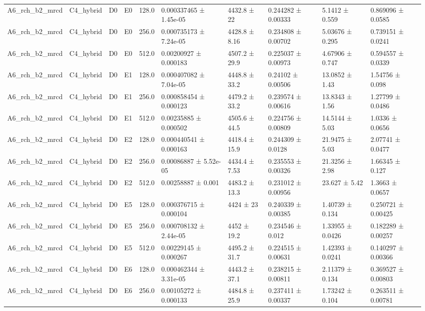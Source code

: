 \begin{table}
\begin{tabular}{llllllllll}
A6\_rch\_b2\_mrcd & C4\_hybrid & D0 & E0 & 128.0 & 0.000337465 ± 1.45e-05 & 4432.8 ± 22 & 0.244282 ± 0.00333 & 5.1412 ± 0.559 & 0.869096 ± 0.0585 \\
A6\_rch\_b2\_mrcd & C4\_hybrid & D0 & E0 & 256.0 & 0.000735173 ± 7.24e-05 & 4428.8 ± 8.16 & 0.234808 ± 0.00702 & 5.03676 ± 0.295 & 0.739151 ± 0.0241 \\
A6\_rch\_b2\_mrcd & C4\_hybrid & D0 & E0 & 512.0 & 0.00200927 ± 0.000183 & 4507.2 ± 29.9 & 0.225037 ± 0.00973 & 4.67906 ± 0.747 & 0.594557 ± 0.0339 \\
A6\_rch\_b2\_mrcd & C4\_hybrid & D0 & E1 & 128.0 & 0.000407082 ± 7.04e-05 & 4448.8 ± 33.2 & 0.24102 ± 0.00506 & 13.0852 ± 1.43 & 1.54756 ± 0.098 \\
A6\_rch\_b2\_mrcd & C4\_hybrid & D0 & E1 & 256.0 & 0.000858454 ± 0.000123 & 4479.2 ± 33.2 & 0.239574 ± 0.00616 & 13.8343 ± 1.56 & 1.27799 ± 0.0486 \\
A6\_rch\_b2\_mrcd & C4\_hybrid & D0 & E1 & 512.0 & 0.00235885 ± 0.000502 & 4505.6 ± 44.5 & 0.224756 ± 0.00809 & 14.5144 ± 5.03 & 1.0336 ± 0.0656 \\
A6\_rch\_b2\_mrcd & C4\_hybrid & D0 & E2 & 128.0 & 0.000440541 ± 0.000163 & 4418.4 ± 15.9 & 0.244309 ± 0.0128 & 21.9475 ± 5.03 & 2.07741 ± 0.0477 \\
A6\_rch\_b2\_mrcd & C4\_hybrid & D0 & E2 & 256.0 & 0.00086887 ± 5.52e-05 & 4434.4 ± 7.53 & 0.235553 ± 0.00326 & 21.3256 ± 2.98 & 1.66345 ± 0.127 \\
A6\_rch\_b2\_mrcd & C4\_hybrid & D0 & E2 & 512.0 & 0.00258887 ± 0.001 & 4483.2 ± 13.3 & 0.231012 ± 0.00956 & 23.627 ± 5.42 & 1.3663 ± 0.0657 \\
A6\_rch\_b2\_mrcd & C4\_hybrid & D0 & E5 & 128.0 & 0.000376715 ± 0.000104 & 4424 ± 23 & 0.240339 ± 0.00385 & 1.40739 ± 0.134 & 0.250721 ± 0.00425 \\
A6\_rch\_b2\_mrcd & C4\_hybrid & D0 & E5 & 256.0 & 0.000708132 ± 2.44e-05 & 4452 ± 19.2 & 0.234546 ± 0.012 & 1.33955 ± 0.0426 & 0.182289 ± 0.00257 \\
A6\_rch\_b2\_mrcd & C4\_hybrid & D0 & E5 & 512.0 & 0.00229145 ± 0.000267 & 4495.2 ± 31.7 & 0.224515 ± 0.00631 & 1.42393 ± 0.0241 & 0.140297 ± 0.00366 \\
A6\_rch\_b2\_mrcd & C4\_hybrid & D0 & E6 & 128.0 & 0.000462344 ± 3.31e-05 & 4443.2 ± 37.1 & 0.238215 ± 0.00811 & 2.11379 ± 0.134 & 0.369527 ± 0.00803 \\
A6\_rch\_b2\_mrcd & C4\_hybrid & D0 & E6 & 256.0 & 0.00105272 ± 0.000133 & 4484.8 ± 25.9 & 0.237411 ± 0.00337 & 1.73242 ± 0.104 & 0.263511 ± 0.00781 \\

\end{tabular}
\end{table}
